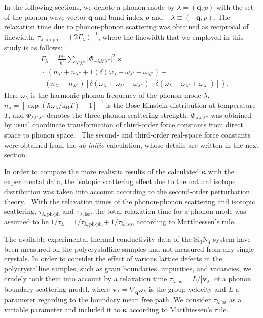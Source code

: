 \documentclass[twocolumn,amsmath,amssymb,a4paper,prb,superscriptaddress,floatfix]{revtex4-1}
\begin{document}
In the following sections, we denote a phonon mode by $\lambda=(\mathbf{q},p)$
with the set of the phonon wave vector $\mathbf{q}$ and band index $p$ and $-\lambda \equiv (-\mathbf{q},p)$. The
relaxation time due to phonon-phonon scattering was obtained as reciprocal of
linewidth, $\tau_{\lambda,\text{ph-ph}}=(2\Gamma_\lambda)^{-1}$, where the
linewidth that we employed in this study is as follows:
\begin{align}
 \label{eq:linewidth}
 &\Gamma_\lambda = \frac{18\pi}{\hbar^2}
  \sum_{\lambda' \lambda''}
  \bigl|\Phi_{-\lambda\lambda'\lambda''}\bigl|^2 \times \nonumber \\ 
 &\left\{ (n_{\lambda'} + n_{\lambda''}+1) 
   \delta(\omega_\lambda-\omega_{\lambda'}-\omega_{\lambda''}) \right.
   + \nonumber \\ 
 &\;\;(n_{\lambda'}-n_{\lambda''})
  \left[\delta(\omega_\lambda +\omega_{\lambda'}-\omega_{\lambda''})
 \right. 
 \left. -\left. \delta(\omega_\lambda - \omega_{\lambda'}+\omega_{\lambda''})
 \right]\right\}.
\end{align}
Here $\omega_\lambda$ is the harmonic phonon frequency of the phonon mode
$\lambda$, $n_\lambda=[\exp(\hbar\omega_\lambda/\mathrm{k_B}T)-1]^{-1}$ is
the Bose-Einstein distribution at temperature $T$, and
$\Phi_{\lambda\lambda'\lambda''}$ denotes the three-phonon-scattering strength.
$\Phi_{\lambda\lambda'\lambda''}$ was obtained by usual coordinate
transformation of third-order force constants from direct space to phonon
space.~\cite{phono3py} The second- and third-order real-space force constants
were obtained from the {\it ab-initio} calculation, whose details are written in the
next section.

In order to compare the more realistic results of the calculated $\boldsymbol{\kappa}$ with the
experimental data, the isotopic scattering effect due to the natural isotope
distribution was taken into account according to the second-order perturbation
theory.~\cite{tamura} With the relaxation times of the phonon-phonon scattering
and isotopic scattering, $\tau_{\lambda,\text{ph-ph}}$ and
$\tau_{\lambda,\text{iso}}$, the total relaxation time for a phonon mode was
assumed to be $1/\tau_{\lambda} = 1/\tau_{\lambda,\text{ph-ph}} +
1/\tau_{\lambda,\text{iso}}$, according to Matthiessen's rule.

The available experimental thermal conductivity data of the Si$_3$N$_4$ system
have been measured on the polycrystalline samples and not measured from any
single crystals. In order to consider the effect of various lattice defects in
the polycrystalline samples, such as grain boundaries, impurities, and
vacancies, we crudely took them into account by a relaxation time
$\tau_{\lambda,\text{bs}}=L/|\mathbf{v}_\lambda|$ of a phonon boundary
scattering model, where $\mathbf{v}_\lambda =
\nabla_{\mathbf{q}}\omega_\lambda$ is the group velocity and $L$ a
parameter regarding to the boundary mean free path. We consider
$\tau_{\lambda,\text{bs}}$ as a variable parameter and included it to
$\boldsymbol{\kappa}$ according to Matthiessen's rule.
\end{document}
